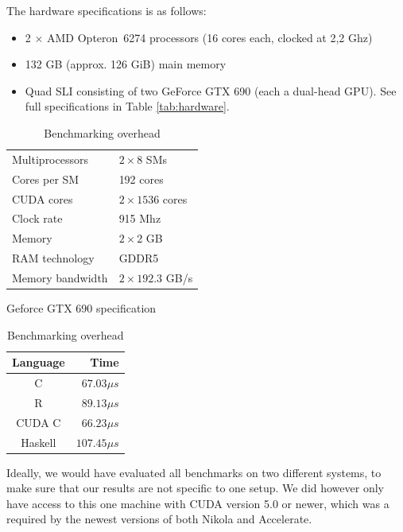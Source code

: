 The hardware specifications is as follows:
\begin{itemize}
\item 2 $\times$ AMD Opteron\texttrademark\ 6274 processors (16 cores each, clocked at 2,2 Ghz)
\item 132 GB (approx. 126 GiB) main memory
\item Quad SLI consisting of two GeForce GTX 690 (each a dual-head
  GPU). See full specifications in Table \ref{tab:hardware}.
\end{itemize}
\begin{table}
\begin{minipage}[b]{0.50\linewidth}
  \centering
  \begin{tabular}{ll}
    Multiprocessors & $2 \times 8$ SMs\\
    Cores per SM & 192 cores \\
    CUDA cores & $2 \times 1536$ cores\\
    Clock rate & 915 Mhz \\
    Memory & $2 \times 2$ GB \\
    RAM technology & GDDR5 \\
    Memory bandwidth & $2 \times 192.3$ GB/s \\
    \hline
  \end{tabular}
  \caption{Geforce GTX 690 specification}
  \label{tab:hardware}
\end{minipage}
\begin{minipage}[b]{0.50\linewidth}
  \centering
  \begin{tabular}{cr}
    \textbf{Language} & \textbf{Time}  \\ \hline
    C & $67.03 \mu s$ \\
    R & $89.13 \mu s$ \\
    CUDA C & $66.23 \mu s$ \\
    Haskell & $107.45 \mu s$ \\ \hline
  \end{tabular}
  \caption{Benchmarking overhead}
  \label{tab:benchmarking-overhead}
\end{minipage}
\end{table}

Ideally, we would have evaluated all benchmarks on two different
systems, to make sure that our results are not specific to one
setup. We did however only have access to this one machine with CUDA
version 5.0 or newer, which was a required by the newest versions of
both Nikola and Accelerate.

